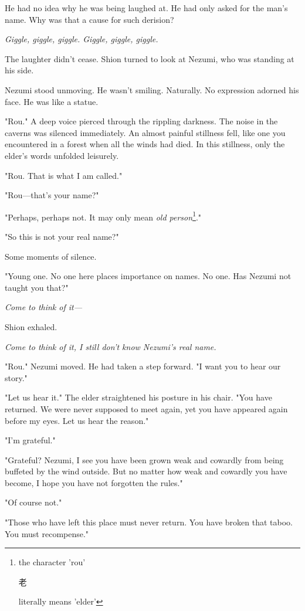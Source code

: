 He had no idea why he was being laughed at. He had only asked for the
man's name. Why was that a cause for such derision?

\emph{Giggle, giggle, giggle. Giggle, giggle, giggle.}

The laughter didn't cease. Shion turned to look at Nezumi, who was
standing at his side.

Nezumi stood unmoving. He wasn't smiling. Naturally. No expression
adorned his face. He was like a statue.

"Rou." A deep voice pierced through the rippling darkness. The noise in
the caverns was silenced immediately. An almost painful stillness fell,
like one you encountered in a forest when all the winds had died. In
this stillness, only the elder's words unfolded leisurely.

"Rou. That is what I am called."

"Rou---that's your name?"

"Perhaps, perhaps not. It may only mean \emph{old person}\footnote{the character 'rou' \begin{CJK}{UTF8}{min}老\end{CJK} literally means 'elder'}."

"So this is not your real name?"

Some moments of silence.

"Young one. No one here places importance on names. No one. Has Nezumi
not taught you that?"

\emph{Come to think of it---}

Shion exhaled.

\emph{Come to think of it, I still don't know Nezumi's real name.}

"Rou." Nezumi moved. He had taken a step forward. "I want you to hear
our story."

"Let us hear it." The elder straightened his posture in his chair. "You
have returned. We were never supposed to meet again, yet you have
appeared again before my eyes. Let us hear the reason."

"I'm grateful."

"Grateful? Nezumi, I see you have been grown weak and cowardly from
being buffeted by the wind outside. But no matter how weak and cowardly
you have become, I hope you have not forgotten the rules."

"Of course not."

"Those who have left this place must never return. You have broken that
taboo. You must recompense."

